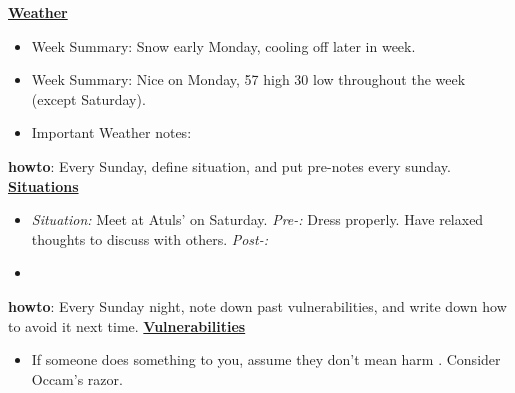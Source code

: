 \documentclass[11pt]{article}
\newcommand{\comments}[1]{}
\begin{document}
{            %
            \textbf{\small \underline{Weather}} 
            \begin{itemize} 
              \tiny \item \tiny Week Summary: Snow early Monday,
              cooling off later in week. 
              \tiny \item \tiny Week Summary: Nice on Monday, 57 high
              30 low throughout the week (except Saturday). 
            \item \tiny Important Weather notes:  
            \end{itemize} 

            \textbf{howto}: Every Sunday, define situation, and put pre-notes every sunday. \\
            \textbf{\small \underline{Situations}} \\ 
            \begin{itemize}
            \item \tiny \textit{Situation:} Meet at Atuls' on
              Saturday. \textit{Pre-:}  Dress properly. Have relaxed
              thoughts to discuss with others. \textit{Post-:} 
           \item \tiny 
            \end{itemize}
      
            \textbf{howto}: Every Sunday night, note down  past vulnerabilities, and write down how to avoid it next time.
            \textbf{\small \underline{Vulnerabilities}}\\
            \begin{itemize}
              \tiny \item \tiny If someone does something to you,
              assume they don't mean harm  . Consider Occam's razor. 

            \end{itemize}    
            \newpage 
            
            \comments{
              \noindent\begin{minipage}{\textwidth}
              \begin{minipage}[c][6cm][c]{\dimexpr0.5\textwidth-0.5\Colsep\relax}
                \lipsum[4]
              \end{minipage}\hfill
              \begin{minipage}[c][6cm][c]{\dimexpr0.5\textwidth-0.5\Colsep\relax}
                \lipsum[4]
              \end{minipage}%
              \end{minipage}
              \lipsum[4]
            }
            
}
\end{document}
